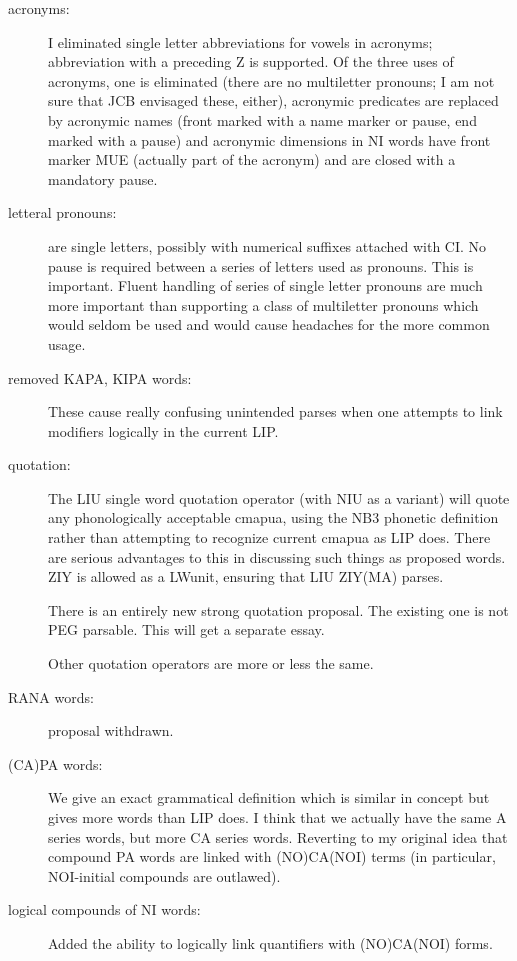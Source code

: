 \documentclass[12pt]{article}
\begin{document}
\begin{description}
\begin{description}
\item[acronyms:]  I eliminated single letter abbreviations for vowels in acronyms; abbreviation with a preceding Z is supported.
Of the three uses of acronyms, one is eliminated (there are no multiletter pronouns; I am not sure that JCB envisaged these, either), acronymic predicates are replaced by acronymic
names (front marked with a name marker or pause, end marked with a pause) and acronymic dimensions in NI words have front marker MUE (actually part of the acronym) and are closed with a mandatory pause.

\item[letteral pronouns:]  are single letters, possibly with numerical suffixes attached with CI.  No pause is required between a series
of letters used as pronouns.   This is important.  Fluent handling of series of single letter pronouns are much more important than
supporting a class of multiletter pronouns which would seldom be used and would cause headaches for the more common usage.

\item[removed KAPA, KIPA words:]   These cause really confusing unintended parses when one attempts to link modifiers logically in the current LIP.

\item[quotation:]   The LIU single word quotation operator (with NIU as a variant) will quote any phonologically acceptable cmapua, using
the NB3 phonetic definition rather than attempting to recognize current cmapua as LIP does.   There are serious advantages to this in 
discussing such things as proposed words.   ZIY is allowed as a LWunit, ensuring that LIU ZIY(MA) parses.

There is an entirely new strong quotation proposal.   The existing one is not PEG parsable.  This will get a separate essay.

Other quotation operators are more or less the same.

\item[RANA words:]  proposal withdrawn.

\item[(CA)PA words:]  We give an exact grammatical definition which is similar in concept but gives more words than LIP does.
I think that we actually have the same A series words, but more CA series words.  Reverting to my original idea that compound PA words
are linked with (NO)CA(NOI) terms (in particular, NOI-initial compounds are outlawed).

\item[logical compounds of NI words:]  Added the ability to logically link quantifiers with (NO)CA(NOI) forms.


\end{description}
\end{description}
\end{document}
